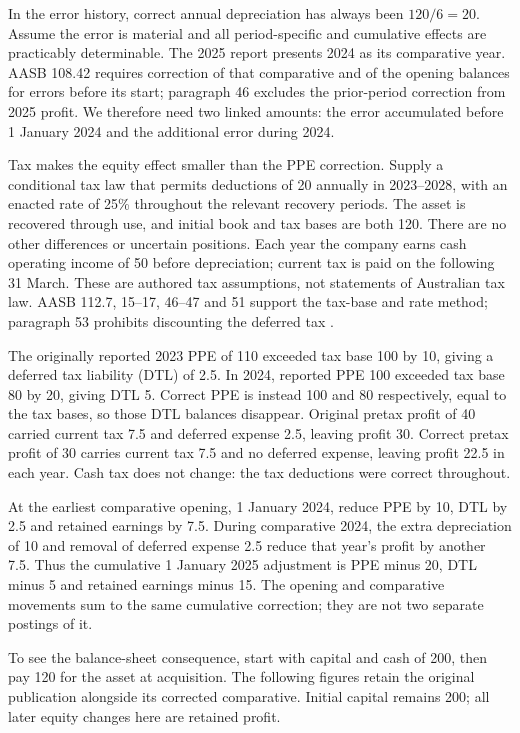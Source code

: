 In the error history, correct annual depreciation has always been
\(120/6=20\). Assume the error is material and all period-specific and
cumulative effects are practicably determinable. The 2025 report presents
2024 as its comparative year. AASB 108.42 requires correction of that
comparative and of the opening balances for errors before its start;
paragraph 46 excludes the prior-period correction from 2025 profit.
We therefore need two linked amounts: the error accumulated before
1 January 2024 and the additional error during 2024.

Tax makes the equity effect smaller than the PPE correction. Supply a
conditional tax law that permits deductions of 20 annually in 2023--2028,
with an enacted rate of 25\% throughout the relevant recovery periods.
The asset is recovered through use, and initial book and tax bases are
both 120. There are no other differences or uncertain positions. Each year
the company earns cash operating income of 50 before depreciation; current
tax is paid on the following 31 March. These are authored tax assumptions,
not statements of Australian tax law. AASB 112.7, 15--17, 46--47 and 51
support the tax-base and rate method; paragraph 53 prohibits discounting
the deferred tax \citep{aasb112dated}.

The originally reported 2023 PPE of 110 exceeded tax base 100 by 10,
giving a deferred tax liability (DTL) of 2.5. In 2024, reported PPE 100
exceeded tax base 80 by 20, giving DTL 5. Correct PPE is instead 100 and
80 respectively, equal to the tax bases, so those DTL balances disappear.
Original pretax profit of 40 carried current tax 7.5 and deferred expense
2.5, leaving profit 30. Correct pretax profit of 30 carries current tax
7.5 and no deferred expense, leaving profit 22.5 in each year. Cash tax
does not change: the tax deductions were correct throughout.

At the earliest comparative opening, 1 January 2024, reduce PPE by 10,
DTL by 2.5 and retained earnings by 7.5. During comparative 2024, the extra
depreciation of 10 and removal of deferred expense 2.5 reduce that year's
profit by another 7.5. Thus the cumulative 1 January 2025 adjustment is
PPE minus 20, DTL minus 5 and retained earnings minus 15. The opening
and comparative movements sum to the same cumulative correction; they
are not two separate postings of it.

To see the balance-sheet consequence, start with capital and cash of 200,
then pay 120 for the asset at acquisition. The following figures retain
the original publication alongside its corrected comparative. Initial
capital remains 200; all later equity changes here are retained profit.

